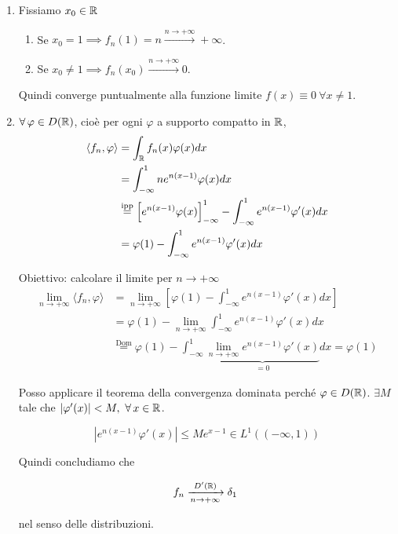 \begin{enumerate}
\item Fissiamo $x_{0} \in \mathbb{R} $
\begin{enumerate}
\item Se $x_{0} = 1\implies f_{n}(1) = n\xrightarrow{n\rightarrow + \infty} + \infty $.
\item Se $x_{0} \neq 1\implies f_{n}(x_{0})\xrightarrow{n\rightarrow + \infty} 0$.
\end{enumerate}

Quindi converge puntualmente alla funzione limite $f(x) \equiv 0\ \forall x\neq 1$.
\item $\forall \varphi \in D(\RR)$, cioè per ogni $\varphi $ a supporto compatto in $\mathbb{R} $,
\begin{align*}
\langle f_{n}, \varphi \rangle  & = \int_{\mathbb{R}} f_{n}(x) \varphi (x) dx\\
 & = \int^{1}_{- \infty} ne^{n(x - 1)} \varphi (x) dx\\
 & \overset{\text{ipp}}{=}\left[ e^{n(x - 1)} \varphi (x)\right]^{1}_{- \infty} - \int^{1}_{- \infty} e^{n(x - 1)} \varphi '(x) dx\\
 & = \varphi (1) - \int^{1}_{- \infty} e^{n(x - 1)} \varphi '(x) dx
\end{align*}

Obiettivo: calcolare il limite per $n\rightarrow + \infty $
\begin{align*}
\lim\limits_{n\rightarrow + \infty} \langle f_{n}, \varphi \rangle  & = \lim\limits_{n\rightarrow + \infty}\left[ \varphi (1) - \int^{1}_{- \infty} e^{n(x - 1)} \varphi '(x) dx\right]\\
 & = \varphi (1) - \lim\limits_{n\rightarrow + \infty}\int^{1}_{- \infty} e^{n(x - 1)} \varphi '(x) dx\\
 & \overset{\text{Dom}}{=} \varphi (1) - \int^{1}_{- \infty}\underbrace{\lim\limits_{n\rightarrow + \infty} e^{n(x - 1)} \varphi '(x)}_{= 0} dx = \varphi (1)
\end{align*}

Posso applicare il teorema della convergenza dominata perché $\varphi \in D(\mathbb{R})$. $\exists M$ tale che $| \varphi '(x)| < M, \ \forall x\in \RR $.

\begin{equation*}
\left| e^{n(x - 1)} \varphi '(x)\right| \leq Me^{x - 1} \in L^{1}((- \infty, 1))
\end{equation*}

Quindi concludiamo che

\begin{equation*}
f_{n}\xrightarrow[n\rightarrow + \infty ]{D'(\mathbb{R})} \delta_{1} \ 
\end{equation*}

nel senso delle distribuzioni.
\end{enumerate}
